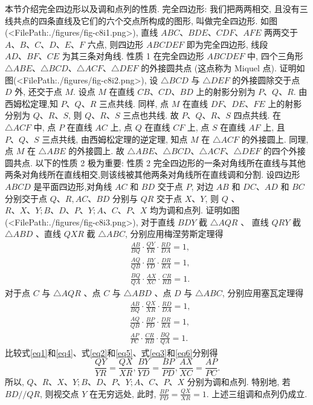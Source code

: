 
本节介绍完全四边形以及调和点列的性质.
完全四边形:
我们把两两相交, 且没有三线共点的四条直线及它们的六个交点所构成的图形, 叫做完全四边形.
如图(<FilePath:./figures/fig-c8i1.png>), 直线 $A B C 、 B D E 、 C D F 、 A F E$ 两两交于 $A 、 B 、 C 、 D 、 E 、 F$ 六点, 则四边形 $A B C D E F$ 即为完全四边形, 线段 $A D 、 B F 、 C E$ 为其三条对角线.
性质 1 在完全四边形 $A B C D E F$ 中, 四个三角形 $\triangle A B E 、 \triangle B C D 、 \triangle A C F 、 \triangle D E F$ 的外接圆共点 (这点称为 Miquel 点).
证明如图(<FilePath:./figures/fig-c8i2.png>), 设 $\triangle B C D$ 与 $\triangle D E F$ 的外接圆除交于点 $D$ 外, 还交于点 $M$.
设点 $M$ 在直线 $C B 、 C D 、 B D$ 上的射影分别为 $P 、 Q 、 R$.
由西姆松定理,知 $P 、 Q 、 R$ 三点共线.
同样, 点 $M$ 在直线 $D F 、 D E 、 F E$ 上的射影分别为 $Q 、 R 、 S$, 则 $Q 、 R 、 S$ 三点也共线.
故 $P 、 Q 、 R 、 S$ 四点共线.
在 $\triangle A C F$ 中, 点 $P$ 在直线 $A C$ 上, 点 $Q$ 在直线 $C F$ 上, 点 $S$ 在直线 $A F$ 上, 且 $P 、 Q 、 S$ 三点共线, 由西姆松定理的逆定理, 知点 $M$ 在 $\triangle A C F$ 的外接圆上.
同理, 点 $M$ 在 $\triangle A B E$ 的外接圆上.
故 $\triangle A B E 、 \triangle B C D 、 \triangle A C F 、 \triangle D E F$ 的四个外接圆共点.
以下的性质 2 极为重要:
性质 2 完全四边形的一条对角线所在直线与其他两条对角线所在直线相交,则该线被其他两条对角线所在直线调和分割.
设四边形 $A B C D$ 是平面四边形,对角线 $A C$ 和 $B D$ 交于点 $P$, 对边 $A B$ 和 $D C 、 A D$ 和 $B C$ 分别交于点 $Q 、 R, A C 、 B D$ 分别与 $Q R$ 交于点 $X 、 Y$, 则 $Q$ 、 $R 、 X 、 Y ; B 、 D 、 P 、 Y ; A 、 C 、 P 、 X$ 均为调和点列.
证明如图(<FilePath:./figures/fig-c8i3.png>), 对于直线 $B D Y$ 截 $\triangle A Q R$ 、 直线 $Q R Y$ 截 $\triangle A B D$ 、直线 $Q X R$ 截 $\triangle A B C$, 分别应用梅涅劳斯定理得
$$
\begin{aligned}
& \frac{A B}{B Q} \cdot \frac{Q Y}{Y R} \cdot \frac{R D}{D A}=1, \label{eq1} \\
& \frac{A Q}{Q B} \cdot \frac{B Y}{Y D} \cdot \frac{D R}{R A}=1, \label{eq2} \\
& \frac{B Q}{Q A} \cdot \frac{A X}{X C} \cdot \frac{C R}{R B}=1 . \label{eq3}
\end{aligned}
$$
对于点 $C$ 与 $\triangle A Q R$ 、点 $C$ 与 $\triangle A B D$ 、点 $D$ 与 $\triangle A B C$, 分别应用塞瓦定理得
$$
\begin{aligned}
& \frac{A B}{B Q} \cdot \frac{Q X}{X R} \cdot \frac{R D}{D A}=1, \label{eq4} \\
& \frac{A Q}{Q B} \cdot \frac{B P}{P D} \cdot \frac{D R}{R A}=1, \label{eq5} \\
& \frac{A P}{P C} \cdot \frac{C R}{R B} \cdot \frac{B Q}{Q A}=1 . \label{eq6}
\end{aligned}
$$
比较式\ref{eq1}和\ref{eq4}、式\ref{eq2}和\ref{eq5}、式\ref{eq3}和\ref{eq6}分别得
$$
\frac{Q Y}{Y R}=\frac{Q X}{X R}, \frac{B Y}{Y D}=\frac{B P}{P D}, \frac{A X}{X C}=\frac{A P}{P C} .
$$
所以, $Q 、 R 、 X 、 Y ; B 、 D 、 P 、 Y ; A 、 C 、 P 、 X$ 分别为调和点列.
特别地, 若 $B D / / Q R$, 则视交点 $Y$ 在无穷远处, 此时, $\frac{B P}{P D}=\frac{Q X}{X R}=1$.
上述三组调和点列仍成立.



